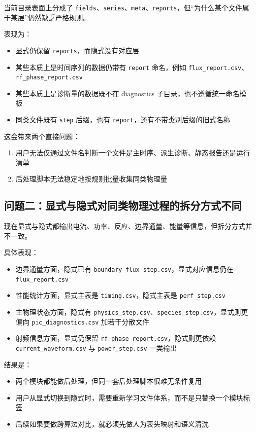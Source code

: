 \documentclass[11pt,a4paper]{ctexart}
\newcommand{\code}[1]{\texttt{#1}}
\newcommand{\file}[1]{\texttt{#1}}
\newcommand{\dir}[1]{\texttt{#1}}
\begin{document}
当前目录表面上分成了 \dir{fields}、\dir{series}、\dir{meta}、\dir{reports}，但“为什么某个文件属于某层”仍然缺乏严格规则。

表现为：

\begin{itemize}
  \item 显式仍保留 \dir{reports}，而隐式没有对应层
  \item 某些本质上是时间序列的数据仍带有 \code{report} 命名，例如 \file{flux\_report.csv}、\file{rf\_phase\_report.csv}
  \item 某些本质上是诊断量的数据既不在 diagnostics 子目录，也不遵循统一命名模板
  \item 同类文件既有 \code{step} 后缀，也有 \code{report}，还有不带类别后缀的旧式名称
\end{itemize}

这会带来两个直接问题：

\begin{enumerate}
  \item 用户无法仅通过文件名判断一个文件是主时序、派生诊断、静态报告还是运行清单
  \item 后处理脚本无法稳定地按规则批量收集同类物理量
\end{enumerate}

\subsection{问题二：显式与隐式对同类物理过程的拆分方式不同}

现在显式与隐式都输出电流、功率、反应、边界通量、能量等信息，但拆分方式并不一致。

具体表现：

\begin{itemize}
  \item 边界通量方面，隐式已有 \file{boundary\_flux\_step.csv}，显式对应信息仍在 \file{flux\_report.csv}
  \item 性能统计方面，显式主表是 \file{timing.csv}，隐式主表是 \file{perf\_step.csv}
  \item 主物理状态方面，隐式有 \file{physics\_step.csv}、\file{species\_step.csv}，显式则更偏向 \file{pic\_diagnostics.csv} 加若干分散文件
  \item 射频信息方面，显式仍保留 \file{rf\_phase\_report.csv}，隐式则更依赖 \file{current\_waveform.csv} 与 \file{power\_step.csv} 一类输出
\end{itemize}

结果是：

\begin{itemize}
  \item 两个模块都能做后处理，但同一套后处理脚本很难无条件复用
  \item 用户从显式切换到隐式时，需要重新学习文件体系，而不是只替换一个模块标签
  \item 后续如果要做跨算法对比，就必须先做人为表头映射和语义清洗
\end{itemize}
\end{document}

